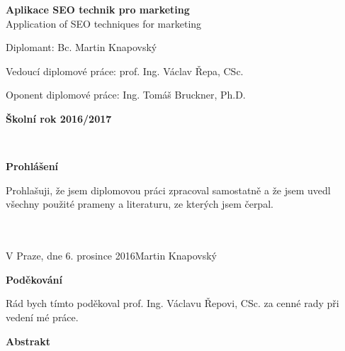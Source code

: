 \begin{center}
\textsf{\textbf{\large{}Aplikace SEO technik pro marketing}}\textsf{\large{}}\\
\textsf{Application of SEO techniques for marketing}
\par\end{center}

\begin{center}
\textsf{\vfill}
\par\end{center}

\textsf{Diplomant: Bc. Martin Knapovský}

\textsf{Vedoucí diplomové práce: prof. Ing. Václav Řepa, CSc.}

\textsf{Oponent diplomové práce: Ing. Tomáš Bruckner, Ph.D. }
\textsf{\vfill}

\begin{center}
\textsf{\textbf{\small{}Školní rok 2016/2017}}
\par\end{center}{\small \par}

\newpage\thispagestyle{empty}

~

\vspace{\fill}

\textsf{\textbf{\Large{}Prohlášení}}\textsf{\vspace{12pt}}

\textsf{\hspace{30pt}}Prohlašuji, že jsem diplomovou práci zpracoval
samostatně a že jsem uvedl všechny použité prameny a literaturu, ze
kterých jsem čerpal.\textsf{ \\\\\\}

\textsf{\hspace{30pt}}V Praze, dne 6. prosince 2016\textsf{\hspace{\fill}}Martin Knapovský
\newpage\thispagestyle{empty}


\textsf{\textbf{\Large{}Poděkování}}\textsf{\vspace{12pt}}

\textsf{\hspace{30pt}}Rád bych tímto poděkoval prof. Ing.
Václavu Řepovi, CSc. za cenné rady při vedení mé práce. 

\newpage\thispagestyle{empty}

\noindent

\textsf{\textbf{\Large{}Abstrakt}}\vspace{12pt}
	
